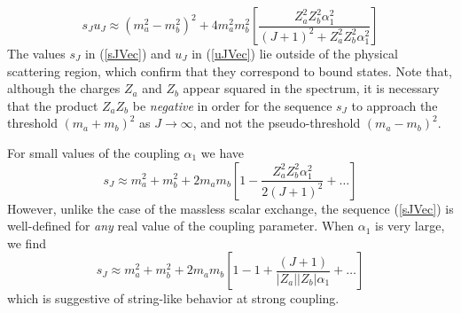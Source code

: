 \begin{equation}
	s_{J} u_{J} \approx (m_{a}^{2} - m_{b}^{2})^{2} + 4 m_{a}^{2} m_{b}^{2} \left[ \frac{Z_{a}^{2} Z_{b}^{2} \alpha_{1}^{2}}{(J + 1)^{2} + Z_{a}^{2} Z_{b}^{2} \alpha_{1}^{2}} \right]
\end{equation}
The values $s_{J}$ in (\ref{sJVec}) and $u_{J}$ in (\ref{uJVec}) lie outside of the physical scattering region, which confirm that they correspond to bound states. Note that, although the charges $Z_{a}$ and $Z_{b}$ appear squared in the spectrum, it is necessary that the product $Z_{a} Z_{b}$ be \textit{negative} in order for the sequence $s_{J}$ to approach the threshold $(m_{a} + m_{b})^{2}$ as $J \rightarrow \infty$, and not the pseudo-threshold $(m_{a} - m_{b})^{2}$.

For small values of the coupling $\alpha_{1}$ we have
\begin{equation}
	s_{J} \approx m_{a}^{2} + m_{b}^{2} + 2m_{a}m_{b} \left[1 - \frac{Z_{a}^{2} Z_{b}^{2} \alpha_{1}^{2}}{2(J+1)^{2}} + \ldots \right]
\end{equation}
However, unlike the case of the massless scalar exchange, the sequence (\ref{sJVec}) is well-defined for \textit{any} real value of the coupling parameter. When $\alpha_{1}$ is very large, we find
\begin{equation}
	s_{J} \approx m_{a}^{2} + m_{b}^{2} + 2 m_{a} m_{b} \left[ 1 - 1 + \frac{(J + 1)}{|Z_{a}| |Z_{b}| \alpha_{1}} + \ldots \right] \label{StringSpec}
\end{equation}
which is suggestive of string-like behavior at strong coupling.
